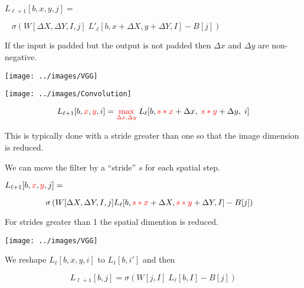 {\vfill
$L_{{\ell+1}}[b,x,y,j] =$

\vfill
$\;\;\;\sigma\left(W[\Delta X, \Delta Y, I,j]\;L'_{{\ell}}[b,x + \Delta X, y + \Delta Y, I] - B[j] \right)$

\vfill
If the input is padded but the output is not padded then $\Delta x$ and $\Delta y$ are non-negative.


\centerline{\texttt{[image: ../images/VGG]}}



\centerline{\texttt{[image: ../images/Convolution]}}

\vfill
$$L_{{\ell+1}}[b,{\color{red}x},{\color{red}y},i] = {\color{red} \max_{\Delta x, \Delta y}}\; L_{{\ell}}[b,{\color{red} s*x} + \Delta x,\; {\color{red} s*y} + \Delta y,\; i]$$

\vfill
This is typically done with a stride greater than one so that the image dimension is reduced.


We can move the filter by a ``stride'' $s$ for each spatial step.

\vfill
$L_{{\ell+1}}[b,{\color{red}x},{\color{red}y},j] =$

$$\hspace{-1em}\sigma\left(W[\Delta X, \Delta Y, I, j] L_{{\ell}}[b,{\color{red} s*x} + \Delta X, {\color{red} s*y} + \Delta Y, I] - B[j]\right)$$

\vfill
For strides greater than 1 the spatial dimention is reduced.



\centerline{\texttt{[image: ../images/VGG]}}



We reshape $L_{{\ell}}[b,x,y,i]$ to $L_{{\ell}}[b,i']$ and then

\vfill
$$L_{{\ell+1}}[b,j] = \sigma\left(W[j,I]\;L_{{\ell}}[b,I] - B[j]\right)$$

}
